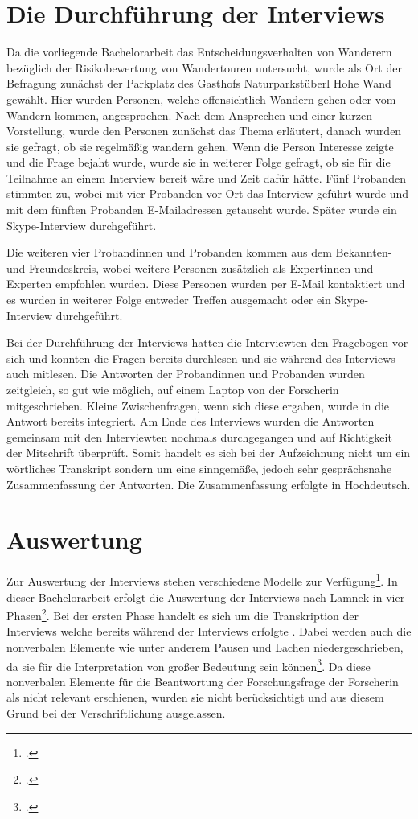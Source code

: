 \section{Die Durchführung der Interviews}

Da die vorliegende Bachelorarbeit das Entscheidungsverhalten von Wanderern bezüglich der Risikobewertung von Wandertouren untersucht, wurde als Ort der Befragung zunächst der Parkplatz des Gasthofs Naturparkstüberl Hohe Wand gewählt. Hier wurden Personen, welche offensichtlich Wandern gehen oder vom Wandern kommen, angesprochen.
Nach dem Ansprechen und einer kurzen Vorstellung, wurde den Personen zunächst das Thema erläutert, danach wurden sie gefragt, ob sie regelmäßig wandern gehen. Wenn die Person Interesse zeigte und die Frage bejaht wurde, wurde sie in weiterer Folge gefragt, ob sie für die Teilnahme an einem Interview bereit wäre und Zeit dafür hätte. Fünf Probanden stimmten zu, wobei mit vier Probanden vor Ort das Interview geführt wurde und mit dem fünften Probanden  E-Mailadressen getauscht wurde. Später wurde ein Skype-Interview durchgeführt.

Die weiteren vier Probandinnen und Probanden kommen aus dem Bekannten- und Freundeskreis, wobei weitere Personen zusätzlich als Expertinnen und Experten empfohlen wurden. Diese Personen wurden per E-Mail kontaktiert und es wurden in weiterer Folge entweder Treffen ausgemacht oder ein Skype-Interview durchgeführt.

Bei der Durchführung der Interviews hatten die Interviewten den Fragebogen vor sich und konnten die Fragen bereits durchlesen und sie während des Interviews auch mitlesen. Die Antworten der Probandinnen und Probanden wurden zeitgleich, so gut wie möglich, auf einem Laptop von der Forscherin mitgeschrieben. Kleine Zwischenfragen, wenn sich diese ergaben, wurde in die Antwort bereits integriert. Am Ende des Interviews wurden die Antworten gemeinsam mit den Interviewten nochmals durchgegangen und auf Richtigkeit der Mitschrift überprüft.
Somit handelt es sich bei der Aufzeichnung nicht um ein wörtliches Transkript sondern um eine sinngemäße, jedoch sehr gesprächsnahe Zusammenfassung der Antworten. Die Zusammenfassung erfolgte in Hochdeutsch.

\section{Auswertung}

Zur Auswertung der Interviews stehen verschiedene Modelle zur Verfügung\footcite[S. 47]{mayer}. In dieser Bachelorarbeit erfolgt die Auswertung der Interviews nach Lamnek in vier Phasen\footcite[S. 367]{lamnek}. Bei der ersten Phase handelt es sich um die Transkription der Interviews welche bereits während der Interviews erfolgte . Dabei werden auch die nonverbalen Elemente wie unter anderem Pausen und Lachen niedergeschrieben, da sie für die Interpretation von großer Bedeutung sein können\footcite[S. 367]{lamnek}. Da diese nonverbalen Elemente für die Beantwortung der Forschungsfrage der Forscherin als nicht relevant erschienen, wurden sie nicht berücksichtigt und aus diesem Grund bei der Verschriftlichung ausgelassen.

